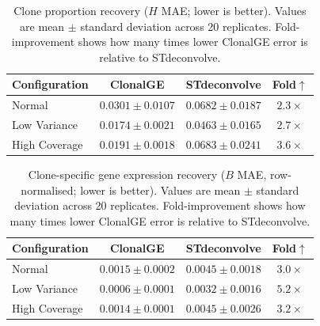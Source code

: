 \documentclass[unnumsec,webpdf,contemporary,large]{oup-authoring-template}%
\theoremstyle{thmstyleone}%
\theoremstyle{thmstyletwo}%
\theoremstyle{thmstylethree}%
\begin{document}



\begin{table}[H]
  \centering
  \caption{%
    Clone proportion recovery (\(H\) MAE; lower is better).
    Values are mean \(\pm\) standard deviation across 20 replicates.
    Fold-improvement shows how many times lower ClonalGE error is relative to STdeconvolve.
  }
  \label{tab:h_mae_comparison}
  \small
  \begin{tabular}{l c c c}
    \toprule
    Configuration
      & {ClonalGE}
      & {STdeconvolve}
      & {Fold\(\uparrow\)} \\
    \midrule
    Normal
      & \(0.0301 \pm 0.0107\)
      & \(0.0682 \pm 0.0187\)
      & \(2.3\times\) \\
    Low Variance
      & \(0.0174 \pm 0.0021\)
      & \(0.0463 \pm 0.0165\)
      & \(2.7\times\) \\
    High Coverage
      & \(0.0191 \pm 0.0018\)
      & \(0.0683 \pm 0.0241\)
      & \(3.6\times\) \\
    \bottomrule
  \end{tabular}
\end{table}

\begin{table}[H]
  \centering
  \caption{%
    Clone-specific gene expression recovery (\(B\) MAE, row-normalised; lower is better).
    Values are mean \(\pm\) standard deviation across 20 replicates.
    Fold-improvement shows how many times lower ClonalGE error is relative to STdeconvolve.
  }
  \label{tab:b_mae_comparison}
  \small
  \begin{tabular}{l c c c}
    \toprule
    Configuration
      & {ClonalGE}
      & {STdeconvolve}
      & {Fold\(\uparrow\)} \\
    \midrule
    Normal
      & \(0.0015 \pm 0.0002\)
      & \(0.0045 \pm 0.0018\)
      & \(3.0\times\) \\
    Low Variance
      & \(0.0006 \pm 0.0001\)
      & \(0.0032 \pm 0.0016\)
      & \(5.2\times\) \\
    High Coverage
      & \(0.0014 \pm 0.0001\)
      & \(0.0045 \pm 0.0026\)
      & \(3.2\times\) \\
    \bottomrule
  \end{tabular}
\end{table}
\end{document}
